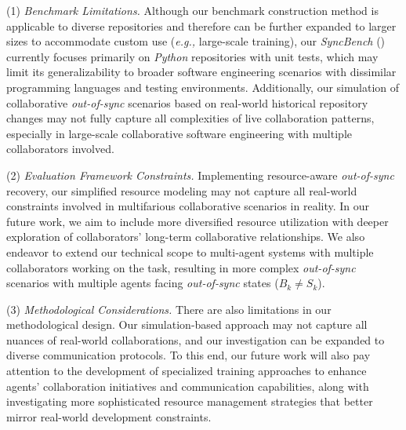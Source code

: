 (1) \textit{Benchmark Limitations.}
Although our benchmark construction method is applicable to diverse \github repositories and therefore can be further expanded to larger sizes to accommodate custom use (\textit{\textit{e.g.,}} large-scale training), our \textit{SyncBench} () currently focuses primarily on \github \textit{Python} repositories with unit tests, which may limit its generalizability to broader software engineering scenarios with dissimilar programming languages and testing environments. 
Additionally, our simulation of collaborative \textit{out-of-sync} scenarios based on real-world historical repository changes may not fully capture all complexities of live collaboration patterns, especially in large-scale collaborative software engineering with multiple collaborators involved.

(2) \textit{Evaluation Framework Constraints.}
Implementing resource-aware \textit{out-of-sync} recovery, our simplified resource modeling may not capture all real-world constraints involved in multifarious collaborative scenarios in reality. In our future work, we aim to include more diversified resource utilization with deeper exploration of collaborators' long-term collaborative relationships. We also endeavor to extend our technical scope to multi-agent systems with multiple collaborators working on the task, resulting in more complex \textit{out-of-sync} scenarios with multiple agents facing \textit{out-of-sync} states ($B_k \neq S_k$).

(3) \textit{Methodological Considerations.}
There are also limitations in our methodological design. Our simulation-based approach may not capture all nuances of real-world collaborations, and our investigation can be expanded to diverse communication protocols. To this end, our future work will also pay attention to the development of specialized training approaches to enhance agents' collaboration initiatives and communication capabilities, along with investigating more sophisticated resource management strategies that better mirror real-world development constraints. 




